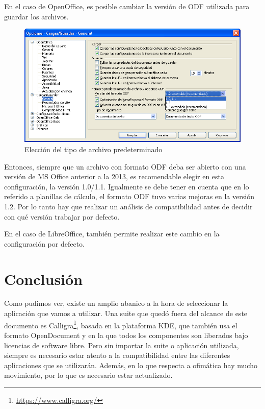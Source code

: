 \documentclass[12pt]{article}
\begin{document}
En el caso de OpenOffice, es posible cambiar la versión de ODF utilizada para guardar los archivos.

\begin{figure}[H]
\centering
\includegraphics[width=1\textwidth]{cambio_version_odf.png}
\renewcommand{\figurename}{Fig.}
\caption{Elección del tipo de archivo predeterminado}
\label{contexto:figura}
\end{figure}

Entonces, siempre que un archivo con formato ODF deba ser abierto con una versión de MS Office anterior a la 2013, es recomendable elegir en esta configuración, la versión 1.0/1.1. Igualmente se debe tener en cuenta que en lo referido a planillas de cálculo, el formato ODF tuvo varias mejoras en la versión 1.2. Por lo tanto hay que realizar un análisis de compatibilidad antes de decidir con qué versión trabajar por defecto.

En el caso de LibreOffice, también permite realizar este cambio en la configuración por defecto.

\section{Conclusión}

Como pudimos ver, existe un amplio abanico a la hora de seleccionar la aplicación que vamos a utilizar. Una suite que quedó fuera del alcance de este documento es Calligra\footnote{\url{https://www.calligra.org/}}, basada en la plataforma KDE, que también usa el formato OpenDocument y en la que todos los componentes son liberados bajo licencias de software libre. Pero sin importar la suite o aplicación utilizada, siempre es necesario estar atento a la compatibilidad entre las diferentes aplicaciones que se utilizarán. Además, en lo que respecta a ofimática hay mucho movimiento, por lo que es necesario estar actualizado. 
\end{document}
